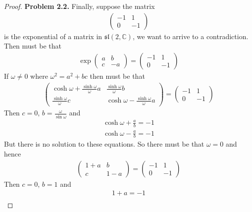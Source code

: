 \documentclass[11pt]{article}
\newcommand{\C}{\mathbb{C}}
\theoremstyle{definition}
\begin{document}
\begin{proof}{\textbf{Problem 2.2.}}
    Finally, suppose the matrix
    \begin{align*}
        \begin{pmatrix}-1 & 1\\ 0 & -1 \end{pmatrix}
    \end{align*}
    is the exponential of a matrix in $\mathfrak{sl}(2,\C)$, we want to arrive
    to a contradiction. Then must be that
    \begin{align*}
        \exp\begin{pmatrix} a & b\\ c &-a \end{pmatrix}
        = \begin{pmatrix}-1 & 1\\ 0 & -1 \end{pmatrix}
    \end{align*}
    If $\omega \neq 0$ where $\omega^2 = a^2 + bc$ then must be that
    \begin{align*}
        \begin{pmatrix}
            \cosh\omega + \frac{\sinh\omega}{\omega}a & \frac{\sinh\omega}{\omega}b\\
            \frac{\sinh\omega}{\omega}c & \cosh\omega - \frac{\sinh\omega}{\omega}a
        \end{pmatrix}
        = \begin{pmatrix}-1 & 1\\ 0 & -1 \end{pmatrix}
    \end{align*}
    Then $c = 0$, $b = \frac{\omega}{\sin\omega}$ and
    \begin{align*}
        \cosh\omega + \frac{a}{b} = -1\\
        \cosh\omega - \frac{a}{b} = -1
    \end{align*}
    But there is no solution to these equations.
    So there must be that $\omega = 0$ and hence
    \begin{align*}
        \begin{pmatrix} 1 + a & b\\ c & 1-a \end{pmatrix}
        = \begin{pmatrix}-1 & 1\\ 0 & -1 \end{pmatrix}
    \end{align*}
    Then $c = 0$, $b = 1$ and
    \begin{align*}
        1 + a = -1\\

\end{align*}
\end{proof}
\end{document}
